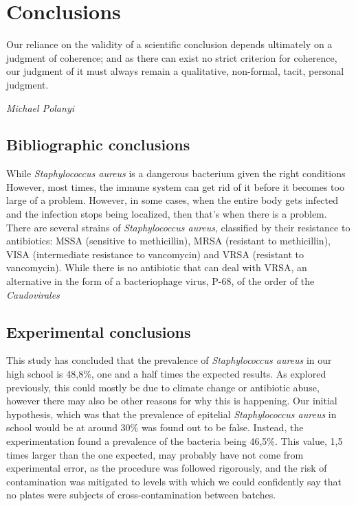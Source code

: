 \chapter{Conclusions}
\epigraph{Our reliance on the validity of a scientific conclusion depends ultimately on a judgment of coherence; and as there can exist no strict criterion for coherence, our judgment of it must always remain a qualitative, non-formal, tacit, personal judgment.}{\textit{Michael Polanyi}}
\section{Bibliographic conclusions}
While \emph{Staphylococcus aureus} is a dangerous bacterium given the right conditions However, most times, the immune system can get rid of it before it becomes too large of a problem. However, in some cases, when the entire body gets infected and the infection stops being localized, then that's when there is a problem. There are several strains of \emph{Staphylococcus aureus}, classified by their resistance to antibiotics: MSSA (sensitive to methicillin), MRSA (resistant to methicillin), VISA (intermediate resistance to vancomycin) and VRSA (resistant to vancomycin). While there is no antibiotic that can deal with VRSA, an alternative in the form of a bacteriophage virus, P-68, of the order of the \emph{Caudovirales}
\section{Experimental conclusions}
This study has concluded that the prevalence of \emph{Staphylococcus aureus} in our high school is 48,8\%, one and a half times the expected results. As explored previously, this could mostly be due to climate change or antibiotic abuse, however there may also be other reasons for why this is happening. Our initial hypothesis, which was that the prevalence of epitelial \emph{Staphylococcus aureus} in school would be at around 30\% was found out to be false. Instead, the experimentation found a prevalence of the bacteria being 46,5\%. This value, 1,5 times larger than the one expected, may probably have not come from experimental error, as the procedure was followed rigorously, and the risk of contamination was mitigated to levels with which we could confidently say that no plates were subjects of cross-contamination between batches.\newline
